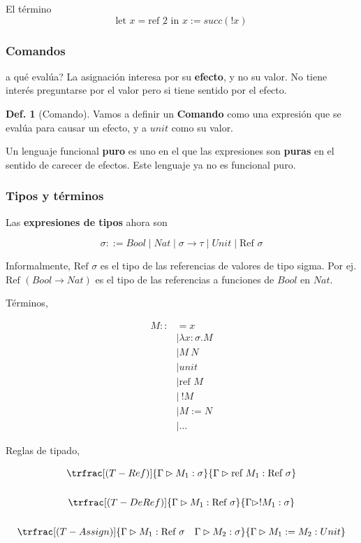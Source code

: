 \documentclass{report}
\theoremstyle{definition} %
\newtheorem{definition}{Def.}[chapter]
\newcommand{\tfunc}[2]{#1 \to #2}
\newcommand{\abs}[3]{\lambda #1 : #2 . #3}
\newcommand{\app}[2]{#1 \ #2} %
\newcommand{\tipa}[3]{#1 \rhd #2 : #3} %
\newcommand{\Gtipa}[2]{\tipa{\Gamma}{#1}{#2}}
\newcommand{\suc}[1]{succ(#1)}
\newcommand{\num}[1]{\underbar{#1}} %
\newcommand{\uletin}[3]{\text{let } #1 = #2 \text{ in } #3} %
\newcommand{\alloc}[1]{\text{ref } #1}
\newcommand{\dealloc}[1]{!#1}
\newcommand{\assign}[2]{#1 := #2}
\newcommand{\unit}{unit}
\newcommand{\tunit}{Unit}
\newcommand{\tref}[1]{\text{Ref } #1}
\newcommand{\deriv}[3]{\trfrac[(#1)]{#2}{#3}}
\begin{document}
El término
\[
    \uletin
        {x}
        {\alloc{\num{2}}}
        {\assign{x}{\suc{\dealloc{x}}}}
\]

\subsubsection{Comandos}

a qué evalúa? La asignación interesa por su \textbf{efecto}, y no su valor. No
tiene interés preguntarse por el valor pero si tiene sentido por el efecto.

\begin{definition}[Comando]
Vamos a definir un \textbf{Comando} como una expresión que se evalúa para
causar un efecto, y a $unit$ como su valor.
\end{definition}

Un lenguaje funcional \textbf{puro} es uno en el que las expresiones son
\textbf{puras} en el sentido de carecer de efectos. Este lenguaje ya no es
funcional puro.

\subsubsection{Tipos y términos}

Las \textbf{expresiones de tipos} ahora son

\[
    \sigma ::= Bool 
        \mid Nat 
        \mid \tfunc{\sigma}{\tau} 
        \mid \tunit
        \mid \tref{\sigma}
\]

Informalmente, $\tref{\sigma}$ es el tipo de las referencias de valores de tipo
sigma. Por ej. $\tref{(\tfunc{Bool}{Nat})}$ es el tipo de las referencias a
funciones de $Bool$ en $Nat$.

Términos,

\begin{align*}
    M ::&= x \\
        &\mid \abs{x}{\sigma}{M} \\
        &\mid \app{M}{N} \\
        &\mid \unit \\
        &\mid \alloc{M} \\
        &\mid\ \dealloc{M} \\
        &\mid \assign{M}{N} \\
        &\mid \dots
\end{align*}

Reglas de tipado,

\begin{gather*}
    \deriv{T-Ref}
        {\Gtipa{M_1}{\sigma}}
        {\Gtipa{\alloc{M_1}}{\tref{\sigma}}}\\ \\
    \deriv{T-DeRef}
        {\Gtipa{M_1}{\tref{\sigma}}}
        {\Gtipa{\dealloc{M_1}}{\sigma}}\\ \\
    \deriv{T-Assign}
        {\Gtipa{M_1}{\tref{\sigma}} \quad \Gtipa{M_2}{\sigma}}
        {\Gtipa{\assign{M_1}{M_2}}{\tunit}}
\end{gather*}
\end{document}
